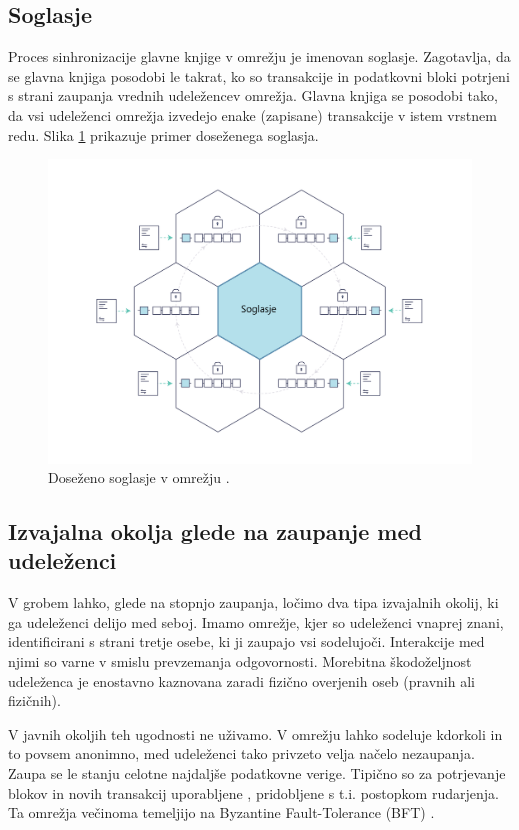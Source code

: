\documentclass[a4paper, 12pt]{book}
\begin{document}
\subsection{Soglasje}
Proces sinhronizacije glavne knjige v omrežju je imenovan soglasje.
Zagotavlja, da se glavna knjiga posodobi le takrat, ko so transakcije in podatkovni bloki potrjeni s strani zaupanja vrednih udeležencev omrežja.
Glavna knjiga se posodobi tako, da vsi udeleženci omrežja izvedejo enake (zapisane) transakcije v istem vrstnem redu.
Slika \ref{consensus} prikazuje primer doseženega soglasja.

\begin{figure}[h]
	\includegraphics[width=1.0\textwidth]{slike/consensus.png}
	\caption{Doseženo soglasje v omrežju \cite{hyperledgerDocs}.}
	\label{consensus}
\end{figure}


\subsection{Izvajalna okolja glede na zaupanje med udeleženci}
V grobem lahko, glede na stopnjo zaupanja, ločimo dva tipa izvajalnih okolij, ki ga udeleženci delijo med seboj.
Imamo omrežje, kjer so udeleženci vnaprej znani, identificirani s strani tretje osebe, ki ji zaupajo vsi sodelujoči.
Interakcije med njimi so varne v smislu prevzemanja odgovornosti.
Morebitna škodoželjnost udeleženca je enostavno kaznovana zaradi fizično overjenih oseb (pravnih ali fizičnih).

V javnih okoljih teh ugodnosti ne uživamo.
V omrežju lahko sodeluje kdorkoli in to povsem anonimno,
med udeleženci tako privzeto velja načelo nezaupanja.
Zaupa se le stanju celotne najdaljše podatkovne verige.
Tipično so za potrjevanje blokov in novih transakcij uporabljene , pridobljene s t.i. postopkom rudarjenja.
Ta omrežja večinoma temeljijo na Byzantine Fault-Tolerance (BFT) \cite{hyperledgerDocs, castro1999practical}.
\end{document}
